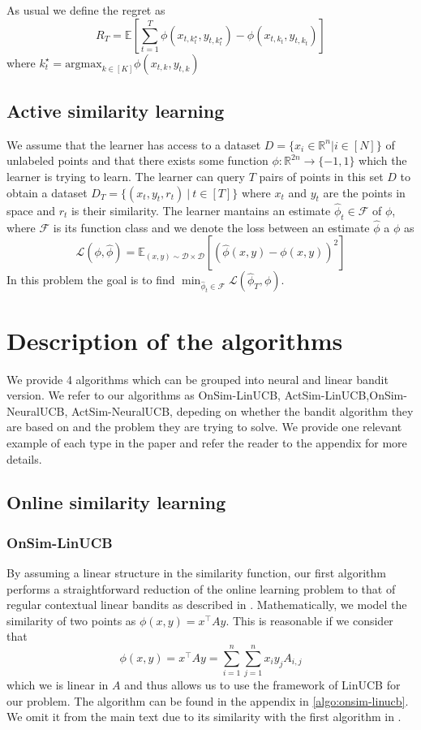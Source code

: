\documentclass{article}
\begin{document}
As usual we define the regret as
\[ R_T = \mathbb{E}\left[\sum_{t =1}^T \phi(x_{t,k^\star_t}, y_{t,k^\star_t}) - \phi(x_{t,k_t}, y_{t,k_t})\right]\]
where $k_t^\star = \text{argmax}_{k\in [K]} \phi(x_{t,k}, y_{t,k})$

\subsection{Active similarity learning}
\label{problem-statement:active-similarity-learning}
We assume that the learner has access to a dataset $D = \{x_i \in \mathbb{R}^n| i \in [N]\}$ of unlabeled points and that there exists some function $\phi: \mathbb{R}^{2n} \to \{-1, 1\}$ which the learner is trying to learn.
The learner can query $T$ pairs of points in this set $D$ to obtain a dataset $D_T = \{(x_t, y_t, r_t) ~|  ~t \in [T]\}$  where $x_t$ and $y_t$ are the points in space and $r_t$ is their similarity.
The learner mantains an estimate $\hat{\phi}_t \in \mathcal{F}$ of $\phi$, where $\mathcal{F}$ is its function class and we denote the loss between an estimate $\hat{\phi}$ a $\phi$ as
\[ \mathcal{L}(\phi, \hat{\phi}) = \mathbb{E}_{(x, y) \sim \mathcal{D} \times \mathcal{D}}[(\hat{\phi}(x,y) - \phi(x, y))^2] \]
In this problem the goal is to find $\min_{\hat{\phi}_t \in \mathcal{F}} \mathcal{L}(\hat{\phi}_T, \phi)$.


\section{Description of the algorithms}
We provide 4 algorithms  which can be grouped into neural and linear bandit version. We refer to our algorithms as OnSim-LinUCB, ActSim-LinUCB,OnSim-NeuralUCB, ActSim-NeuralUCB, depeding on whether the bandit algorithm they are based on and the problem
they are trying to solve. We provide one relevant example of each type in the paper and refer the reader to the appendix for more details.


\subsection{Online similarity learning}
\subsubsection{OnSim-LinUCB}
By assuming a linear structure in the similarity function, our first algorithm performs a straightforward reduction of the online learning problem to that of regular contextual linear bandits as described in \cite{linucb}.
Mathematically, we model the similarity of two points as  $\phi(x, y) = x^\top A y$.
This is reasonable if we consider that
\[\phi(x, y) = x^\top A y = \sum_{i =1}^n\sum_{j=1}^n x_i y_j A_{i,j} \]
which we is linear in $A$ and thus allows us to use the framework of LinUCB for our problem.
The algorithm can be found in the appendix in \ref{algo:onsim-linucb}. We omit it from the main text due to its similarity with the first algorithm in \cite{linucb}.
\end{document}
